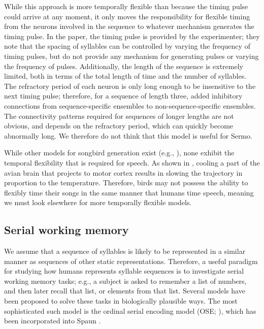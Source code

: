 
While this approach is more temporally flexible
than \citet{troyer2000} because
the timing pulse could arrive at any moment,
it only moves the responsibility for flexible timing
from the neurons involved in the sequence
to whatever mechanism generates the timing pulse.
In the paper, the timing pulse is provided
by the experimenter;
they note that the spacing of syllables
can be controlled by varying the frequency
of timing pulses,
but do not provide any mechanism
for generating pulses
or varying the frequency of pulses.
Additionally, the length of the sequence
is extremely limited,
both in terms of the total length of time
and the number of syllables.
The refractory period of each neuron
is only long enough to be insensitive
to the next timing pulse;
therefore, for a sequence of length three,
\citeauthor{drew2003} added inhibitory connections
from sequence-specific ensembles
to non-sequence-specific ensembles.
The connectivity patterns required
for sequences of longer lengths
are not obvious,
and depends on the refractory period,
which can quickly become abnormally long.
We therefore do not think that
this model is useful for Sermo.

While other models for songbird generation exist
(e.g., \citealt{fee2004}),
none exhibit the temporal flexibility
that is required for speech.
As shown in \citet{fee2010},
cooling a part of the avian brain
that projects to motor cortex
results in slowing the trajectory
in proportion to the temperature.
Therefore, birds may not possess
the ability to flexibly time their songs
in the same manner that humans time speech,
meaning we must look elsewhere for
more temporally flexible models.

\subsection{Serial working memory}

We assume that a sequence of syllables
is likely to be represented
in a similar manner
as sequences of other static representations.
Therefore, a useful paradigm for studying
how humans represents syllable sequences
is to investigate serial working memory tasks;
e.g., a subject is asked to remember
a list of numbers,
and then later recall that list,
or elements from that list.
Several models have been proposed
to solve these tasks
in biologically plausible ways.
The most sophisticated such model
is the ordinal serial encoding model
(OSE; \citealp{choo2010}),
which has been incorporated into
Spaun \citep{eliasmith2012}.

